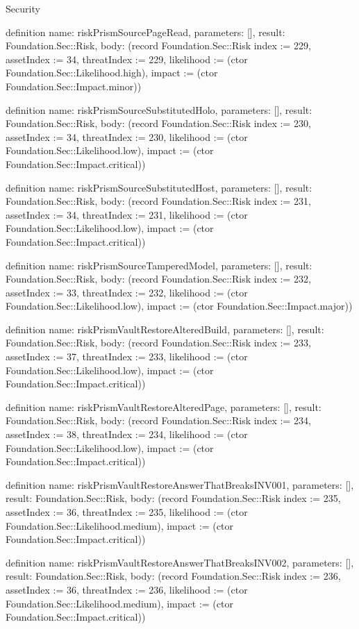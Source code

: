 \begin{lexlean}{Security}
\begin{semanticmodule}
definition{
  name: riskPrismSourcePageRead,
  parameters: [],
  result: Foundation.Sec::Risk,
  body: (record Foundation.Sec::Risk {index := 229, assetIndex := 34, threatIndex := 229, likelihood := (ctor Foundation.Sec::Likelihood.high), impact := (ctor Foundation.Sec::Impact.minor)})
}

definition{
  name: riskPrismSourceSubstitutedHolo,
  parameters: [],
  result: Foundation.Sec::Risk,
  body: (record Foundation.Sec::Risk {index := 230, assetIndex := 34, threatIndex := 230, likelihood := (ctor Foundation.Sec::Likelihood.low), impact := (ctor Foundation.Sec::Impact.critical)})
}

definition{
  name: riskPrismSourceSubstitutedHost,
  parameters: [],
  result: Foundation.Sec::Risk,
  body: (record Foundation.Sec::Risk {index := 231, assetIndex := 34, threatIndex := 231, likelihood := (ctor Foundation.Sec::Likelihood.low), impact := (ctor Foundation.Sec::Impact.critical)})
}

definition{
  name: riskPrismSourceTamperedModel,
  parameters: [],
  result: Foundation.Sec::Risk,
  body: (record Foundation.Sec::Risk {index := 232, assetIndex := 33, threatIndex := 232, likelihood := (ctor Foundation.Sec::Likelihood.low), impact := (ctor Foundation.Sec::Impact.major)})
}

definition{
  name: riskPrismVaultRestoreAlteredBuild,
  parameters: [],
  result: Foundation.Sec::Risk,
  body: (record Foundation.Sec::Risk {index := 233, assetIndex := 37, threatIndex := 233, likelihood := (ctor Foundation.Sec::Likelihood.low), impact := (ctor Foundation.Sec::Impact.critical)})
}

definition{
  name: riskPrismVaultRestoreAlteredPage,
  parameters: [],
  result: Foundation.Sec::Risk,
  body: (record Foundation.Sec::Risk {index := 234, assetIndex := 38, threatIndex := 234, likelihood := (ctor Foundation.Sec::Likelihood.low), impact := (ctor Foundation.Sec::Impact.critical)})
}

definition{
  name: riskPrismVaultRestoreAnswerThatBreaksINV001,
  parameters: [],
  result: Foundation.Sec::Risk,
  body: (record Foundation.Sec::Risk {index := 235, assetIndex := 36, threatIndex := 235, likelihood := (ctor Foundation.Sec::Likelihood.medium), impact := (ctor Foundation.Sec::Impact.critical)})
}

definition{
  name: riskPrismVaultRestoreAnswerThatBreaksINV002,
  parameters: [],
  result: Foundation.Sec::Risk,
  body: (record Foundation.Sec::Risk {index := 236, assetIndex := 36, threatIndex := 236, likelihood := (ctor Foundation.Sec::Likelihood.medium), impact := (ctor Foundation.Sec::Impact.critical)})
}


\end{semanticmodule}
\end{lexlean}
